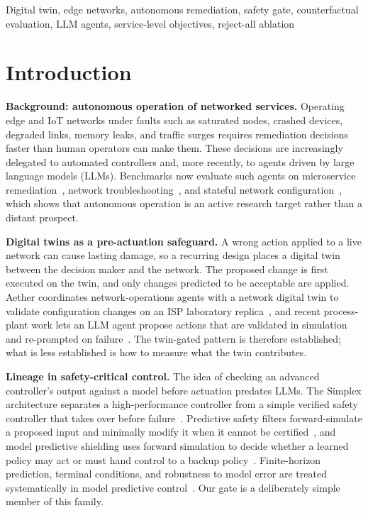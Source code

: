 \documentclass[conference]{IEEEtran}
\begin{document}
\begin{IEEEkeywords}
Digital twin, edge networks, autonomous remediation, safety gate, counterfactual evaluation, LLM agents, service-level objectives, reject-all ablation
\end{IEEEkeywords}

\section{Introduction}

\textbf{Background: autonomous operation of networked services.} Operating edge and IoT networks under faults such as saturated nodes, crashed devices, degraded links, memory leaks, and traffic surges requires remediation decisions faster than human operators can make them. These decisions are increasingly delegated to automated controllers and, more recently, to agents driven by large language models (LLMs). Benchmarks now evaluate such agents on microservice remediation~\cite{microremed}, network troubleshooting~\cite{nika}, and stateful network configuration~\cite{netagentbench}, which shows that autonomous operation is an active research target rather than a distant prospect.

\textbf{Digital twins as a pre-actuation safeguard.} A wrong action applied to a live network can cause lasting damage, so a recurring design places a digital twin between the decision maker and the network. The proposed change is first executed on the twin, and only changes predicted to be acceptable are applied. Aether coordinates network-operations agents with a network digital twin to validate configuration changes on an ISP laboratory replica~\cite{aether}, and recent process-plant work lets an LLM agent propose actions that are validated in simulation and re-prompted on failure~\cite{processplant}. The twin-gated pattern is therefore established; what is less established is how to measure what the twin contributes.

\textbf{Lineage in safety-critical control.} The idea of checking an advanced controller's output against a model before actuation predates LLMs. The Simplex architecture separates a high-performance controller from a simple verified safety controller that takes over before failure~\cite{simplex}. Predictive safety filters forward-simulate a proposed input and minimally modify it when it cannot be certified~\cite{wabersich}, and model predictive shielding uses forward simulation to decide whether a learned policy may act or must hand control to a backup policy~\cite{mps}. Finite-horizon prediction, terminal conditions, and robustness to model error are treated systematically in model predictive control~\cite{rawlings}. Our gate is a deliberately simple member of this family.
\end{document}
